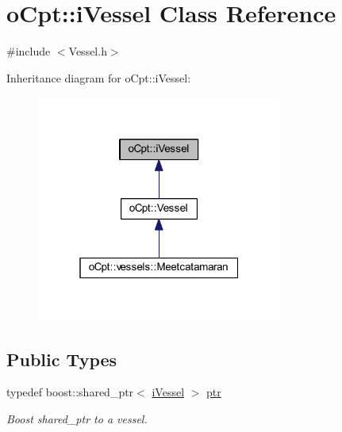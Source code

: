 \hypertarget{classo_cpt_1_1i_vessel}{}\section{o\+Cpt\+:\+:i\+Vessel Class Reference}
\label{classo_cpt_1_1i_vessel}


{\ttfamily \#include $<$Vessel.\+h$>$}



Inheritance diagram for o\+Cpt\+:\+:i\+Vessel\+:
\nopagebreak
\begin{figure}[H]
\begin{center}
\leavevmode
\includegraphics[width=229pt]{classo_cpt_1_1i_vessel__inherit__graph}
\end{center}
\end{figure}
\subsection*{Public Types}
\begin{DoxyCompactItemize}
\item 
typedef boost\+::shared\+\_\+ptr$<$ \hyperlink{classo_cpt_1_1i_vessel}{i\+Vessel} $>$ \hyperlink{classo_cpt_1_1i_vessel_a43711a596f3bdfd0ca732ed3901edc97}{ptr}
\begin{DoxyCompactList}\small\item\em Boost shared\+\_\+ptr to a vessel. \end{DoxyCompactList}\end{DoxyCompactItemize}
